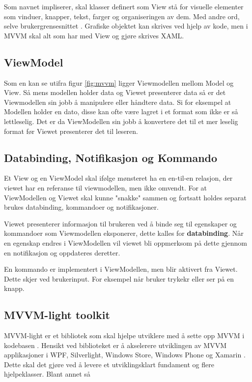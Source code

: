  Som navnet impliserer, skal klasser definert som View stå for visuelle elementer som vinduer, knapper, tekst, farger og organiseringen av dem. Med andre ord, selve brukergrensesnittet \cite{THEM6:online}. Grafiske objektet kan skrives ved hjelp av kode, men i MVVM skal alt som har med View og gjøre skrives XAML.
 
\subsection{ViewModel}
 
 Som en kan se utifra figur \ref{fig:mvvm} ligger Viewmodellen mellom Model og View. Så mens modellen holder data og Viewet presenterer data så er det Viewmodellen sin jobb å manipulere eller håndtere data. Si for eksempel at Modellen holder en dato, disse kan ofte være lagret i et format som ikke er så lettleselig. Det er da ViewModellen sin jobb å konvertere det til et mer leselig format før Viewet presenterer det til leseren. 
 
\subsection{Databinding, Notifikasjon og Kommando}

Et View og en ViewModel skal ifølge mønsteret ha en en-til-en relasjon, der viewet har en referanse til viewmodellen, men ikke omvendt. For at ViewModellen og Viewet skal kunne "snakke" sammen og fortsatt holdes separat brukes databinding, kommandoer og notifikasjoner. 

Viewet presenterer informasjon til brukeren ved å binde seg til egenskaper og kommandoer som Viewmodellen eksponerer, dette kalles for \textbf{databinding}. Når en egenskap endres i ViewModellen vil viewet bli oppmerksom på dette gjennom en notifikasjon og oppdateres deretter. 

En kommando er implementert i ViewModellen, men blir aktivert fra Viewet. Dette skjer ved brukerinput. For eksempel når bruker trykekr eller ser på en knapp.



\subsection{MVVM-light toolkit} 
 
 MVVM-light er et bibliotek som skal hjelpe utviklere med å sette opp MVVM i kodebasen \cite{Nico0:online}. Hensikt ved biblioteket er å akselerere utviklingen av MVVM applikasjoner i WPF, Silverlight, Windows Store, Windows Phone og Xamarin \cite{MVVM8:online}. Dette skal det gjøre ved å levere et utviklingsklart fundament og flere hjelpeklasser. Blant annet så 


